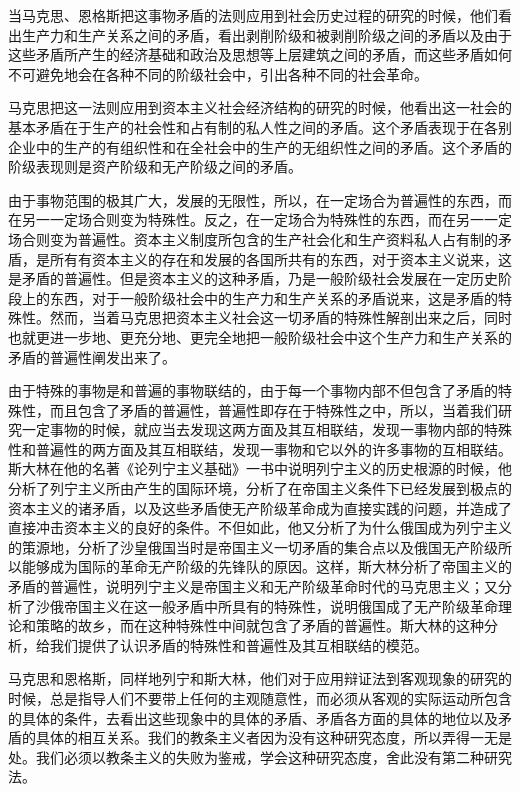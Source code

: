 当马克思、恩格斯把这事物矛盾的法则应用到社会历史过程的研究的时候，他们看出生产力和生产关系之间的矛盾，看出剥削阶级和被剥削阶级之间的矛盾以及由于这些矛盾所产生的经济基础和政治及思想等上层建筑之间的矛盾，而这些矛盾如何不可避免地会在各种不同的阶级社会中，引出各种不同的社会革命。

马克思把这一法则应用到资本主义社会经济结构的研究的时候，他看出这一社会的基本矛盾在于生产的社会性和占有制的私人性之间的矛盾。这个矛盾表现于在各别企业中的生产的有组织性和在全社会中的生产的无组织性之间的矛盾。这个矛盾的阶级表现则是资产阶级和无产阶级之间的矛盾。

由于事物范围的极其广大，发展的无限性，所以，在一定场合为普遍性的东西，而在另一一定场合则变为特殊性。反之，在一定场合为特殊性的东西，而在另一一定场合则变为普遍性。资本主义制度所包含的生产社会化和生产资料私人占有制的矛盾，是所有有资本主义的存在和发展的各国所共有的东西，对于资本主义说来，这是矛盾的普遍性。但是资本主义的这种矛盾，乃是一般阶级社会发展在一定历史阶段上的东西，对于一般阶级社会中的生产力和生产关系的矛盾说来，这是矛盾的特殊性。然而，当着马克思把资本主义社会这一切矛盾的特殊性解剖出来之后，同时也就更进一步地、更充分地、更完全地把一般阶级社会中这个生产力和生产关系的矛盾的普遍性阐发出来了。

由于特殊的事物是和普遍的事物联结的，由于每一个事物内部不但包含了矛盾的特殊性，而且包含了矛盾的普遍性，普遍性即存在于特殊性之中，所以，当着我们研究一定事物的时候，就应当去发现这两方面及其互相联结，发现一事物内部的特殊性和普遍性的两方面及其互相联结，发现一事物和它以外的许多事物的互相联结。斯大林在他的名著《论列宁主义基础》一书中说明列宁主义的历史根源的时候，他分析了列宁主义所由产生的国际环境，分析了在帝国主义条件下已经发展到极点的资本主义的诸矛盾，以及这些矛盾使无产阶级革命成为直接实践的问题，并造成了直接冲击资本主义的良好的条件。不但如此，他又分析了为什么俄国成为列宁主义的策源地，分析了沙皇俄国当时是帝国主义一切矛盾的集合点以及俄国无产阶级所以能够成为国际的革命无产阶级的先锋队的原因。这样，斯大林分析了帝国主义的矛盾的普遍性，说明列宁主义是帝国主义和无产阶级革命时代的马克思主义；又分析了沙俄帝国主义在这一般矛盾中所具有的特殊性，说明俄国成了无产阶级革命理论和策略的故乡，而在这种特殊性中间就包含了矛盾的普遍性。斯大林的这种分析，给我们提供了认识矛盾的特殊性和普遍性及其互相联结的模范。

马克思和恩格斯，同样地列宁和斯大林，他们对于应用辩证法到客观现象的研究的时候，总是指导人们不要带上任何的主观随意性，而必须从客观的实际运动所包含的具体的条件，去看出这些现象中的具体的矛盾、矛盾各方面的具体的地位以及矛盾的具体的相互关系。我们的教条主义者因为没有这种研究态度，所以弄得一无是处。我们必须以教条主义的失败为鉴戒，学会这种研究态度，舍此没有第二种研究法。

